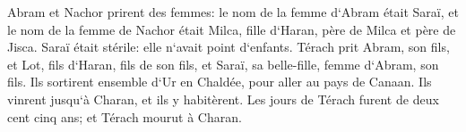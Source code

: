 \verse Abram et Nachor prirent des femmes: le nom de la femme d`Abram était Saraï, et le nom de la femme de Nachor était Milca, fille d`Haran, père de Milca et père de Jisca. 
\verse Saraï était stérile: elle n`avait point d`enfants. 
\verse Térach prit Abram, son fils, et Lot, fils d`Haran, fils de son fils, et Saraï, sa belle-fille, femme d`Abram, son fils. Ils sortirent ensemble d`Ur en Chaldée, pour aller au pays de Canaan. Ils vinrent jusqu`à Charan, et ils y habitèrent. 
\verse Les jours de Térach furent de deux cent cinq ans; et Térach mourut à Charan. 

\chapter{}

